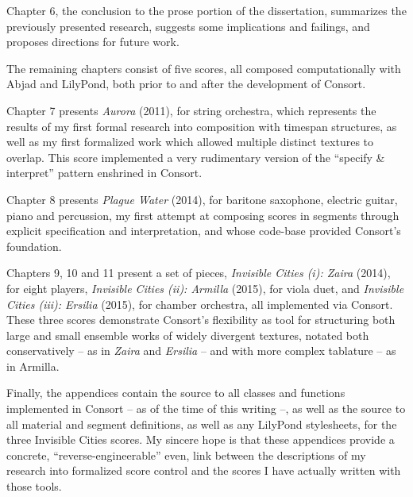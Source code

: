 Chapter 6, the conclusion to the prose portion of the dissertation, summarizes
the previously presented research, suggests some implications and failings, and
proposes directions for future work.

The remaining chapters consist of five scores, all composed computationally
with Abjad and LilyPond, both prior to and after the development of Consort.

Chapter 7 presents \emph{Aurora} (2011), for string orchestra, which 
represents the results of my first formal research into composition with
timespan structures, as well as my first formalized work which allowed multiple
distinct textures to overlap. This score implemented a very rudimentary version
of the \enquote{specify \& interpret} pattern enshrined in Consort.

Chapter 8 presents \emph{Plague Water} (2014), for baritone saxophone, electric
guitar, piano and percussion, my first attempt at composing scores in segments
through explicit specification and interpretation, and whose code-base
provided Consort's foundation.

Chapters 9, 10 and 11 present a set of pieces, \emph{Invisible Cities
(i): Zaira} (2014), for eight players, \emph{Invisible Cities (ii): Armilla}
(2015), for viola duet, and \emph{Invisible Cities (iii): Ersilia} (2015), for
chamber orchestra, all implemented via Consort. These three scores demonstrate
Consort's flexibility as tool for structuring both large and small ensemble
works of widely divergent textures, notated both conservatively -- as in
\emph{Zaira} and \emph{Ersilia} -- and with more complex tablature -- as in
Armilla.

Finally, the appendices contain the source to all classes and functions
implemented in Consort -- as of the time of this writing --, as well as the
source to all material and segment definitions, as well as any LilyPond
stylesheets, for the three Invisible Cities scores. My sincere hope is that
these appendices provide a concrete, \enquote{reverse-engineerable} even, link
between the descriptions of my research into formalized score control and the
scores I have actually written with those tools.

